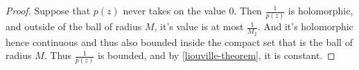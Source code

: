 \documentclass{homework}
\begin{document}
\begin{proof}
                                                                                                                                                                                                                                                            Suppose that $p(z)$ never takes on the value $0$. Then $\frac{1}{p(z)}$ is holomorphic, and outside of the ball of radius $M$, it's value is at most $\frac{1}{M_2}$. And it's holomorphic hence continuous and thus also bounded inside the compact set that is the ball of radius $M$. Thus $\frac{1}{p(z)}$ is bounded, and by \ref{liouville-theorem}, it is constant.
                                                                                                                                                                                                                                                            \end{proof}
                                                                                                                                                                                                                                                            
\end{document}
